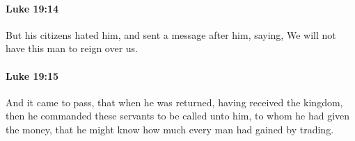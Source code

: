 		\paragraph{Luke 19:14} %
			\label{LUKE-19-14}

			But his citizens hated him, and sent a message after him, saying, We will not have this man to reign over us.

			\begin{framed}
			\scriptsize
				\begin{compactdesc}
					\item[SBLG] 
				\end{compactdesc}
			\end{framed}

		\paragraph{Luke 19:15} %
			\label{LUKE-19-15}

			And it came to pass, that when he was returned, having received the kingdom, then he commanded these servants to be called unto him, to whom he had given the money, that he might know how much every man had gained by trading.

